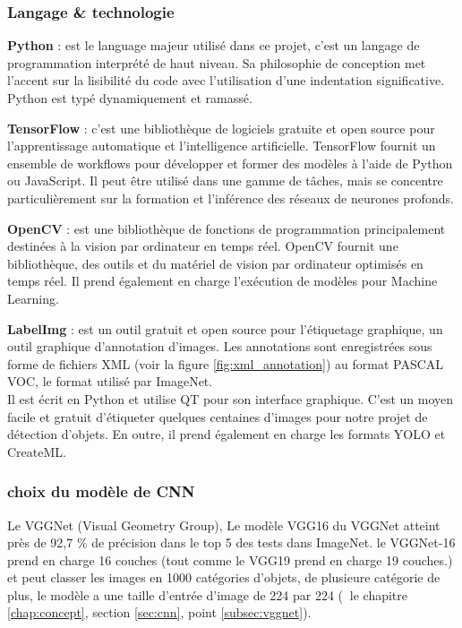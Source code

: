 	\subsubsection{Langage \& technologie}
	\begin{list}{}{Le langage de programmation et les technologies utilisées.}
		\item \textbf{Python} : est le language majeur utilisé dans ce projet, c'est un langage de programmation interprété de haut niveau. Sa philosophie de conception met l'accent sur la lisibilité du code avec l'utilisation d'une indentation significative. Python est typé dynamiquement et ramassé.
		\item \textbf{TensorFlow} : c’est une bibliothèque de logiciels gratuite et open source pour l'apprentissage automatique et l'intelligence artificielle. TensorFlow fournit un ensemble de workflows pour développer et former des modèles à l'aide de Python ou JavaScript. Il peut être utilisé dans une gamme de tâches, mais se concentre particulièrement sur la formation et l'inférence des réseaux de neurones profonds.
		\item \textbf{OpenCV} : est une bibliothèque de fonctions de programmation principalement destinées à la vision par ordinateur en temps réel. OpenCV fournit une bibliothèque, des outils et du matériel de vision par ordinateur optimisés en temps réel. Il prend également en charge l'exécution de modèles pour Machine Learning.
		
		\item \textbf{LabelImg} : est un outil gratuit et open source pour l'étiquetage graphique, un outil graphique d'annotation d'images. Les annotations sont enregistrées sous forme de fichiers XML (voir la figure \ref{fig:xml_annotation}) au format PASCAL VOC, le format utilisé par ImageNet.\\
		Il est écrit en Python et utilise QT pour son interface graphique. C'est un moyen facile et gratuit d'étiqueter quelques centaines d'images pour notre projet de détection d'objets. En outre, il prend également en charge les formats YOLO et CreateML.
		
	\end{list}
	
	\subsubsection{choix du modèle de CNN}
	Le VGGNet (Visual Geometry Group), Le modèle VGG16 du VGGNet atteint près de 92,7 \% de précision dans le top 5 des tests dans ImageNet. le VGGNet-16 prend en charge 16 couches (tout comme le VGG19 prend en charge 19 couches.) et peut classer les images en 1000 catégories d'objets, de plusieure catégorie de plus, le modèle a une taille d'entrée d'image de 224 par 224 (\cf$ \ $ le chapitre \ref{chap:concept}, section \ref{sec:cnn}, point \ref{subsec:vggnet}).
	
